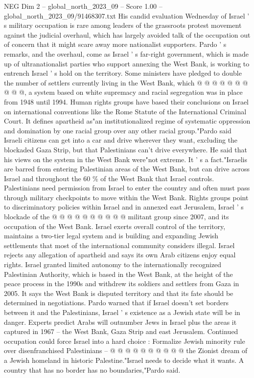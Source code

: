 \begin{textsample}{NEG Dim 2 – global\_north\_2023\_09 – Score 1.00 – global\_north\_2023\_09/91468307.txt}
His candid evaluation Wednesday of Israel ' s military occupation is rare among leaders of the grassroots protest movement against the judicial overhaul, which has largely avoided talk of the occupation out of concern that it might scare away more nationalist supporters.
Pardo ' s remarks, and the overhaul, come as Israel ' s far-right government, which is made up of ultranationalist parties who support annexing the West Bank, is working to entrench Israel ' s hold on the territory.
Some ministers have pledged to double the number of settlers currently living in the West Bank, which @ @ @ @ @ @ @ @ @ @, a system based on white supremacy and racial segregation was in place from 1948 until 1994.
Human rights groups have based their conclusions on Israel on international conventions like the Rome Statute of the International Criminal Court.
It defines apartheid as"an institutionalized regime of systematic oppression and domination by one racial group over any other racial group."Pardo said Israeli citizens can get into a car and drive wherever they want, excluding the blockaded Gaza Strip, but that Palestinians can't drive everywhere.
He said that his views on the system in the West Bank were"not extreme.
It ' s a fact."Israelis are barred from entering Palestinian areas of the West Bank, but can drive across Israel and throughout the 60 \% of the West Bank that Israel controls.
Palestinians need permission from Israel to enter the country and often must pass through military checkpoints to move within the West Bank.
Rights groups point to discriminatory policies within Israel and in annexed east Jerusalem, Israel ' s blockade of the @ @ @ @ @ @ @ @ @ @ militant group since 2007, and its occupation of the West Bank.
Israel exerts overall control of the territory, maintains a two-tier legal system and is building and expanding Jewish settlements that most of the international community considers illegal.
Israel rejects any allegation of apartheid and says its own Arab citizens enjoy equal rights.
Israel granted limited autonomy to the internationally recognized Palestinian Authority, which is based in the West Bank, at the height of the peace process in the 1990s and withdrew its soldiers and settlers from Gaza in 2005.
It says the West Bank is disputed territory and that its fate should be determined in negotiations.
Pardo warned that if Israel doesn't set borders between it and the Palestinians, Israel ' s existence as a Jewish state will be in danger.
Experts predict Arabs will outnumber Jews in Israel plus the areas it captured in 1967 -- the West Bank, Gaza Strip and east Jerusalem.
Continued occupation could force Israel into a hard choice : Formalize Jewish minority rule over disenfranchised Palestinians -- @ @ @ @ @ @ @ @ @ @ the Zionist dream of a Jewish homeland in historic Palestine."Israel needs to decide what it wants.
A country that has no border has no boundaries,"Pardo said.

\end{textsample}
